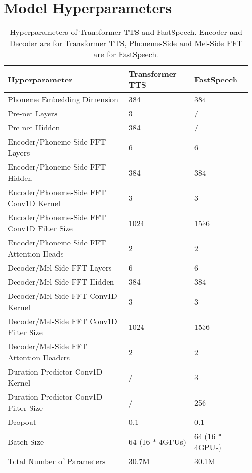 \documentclass{article}
\begin{document}
\section{Model Hyperparameters}
\begin{table}[h]
\caption{Hyperparameters of Transformer TTS and FastSpeech. Encoder and Decoder are for Transformer TTS, Phoneme-Side and Mel-Side FFT are for FastSpeech. }
\vspace{0.5cm}
\centering
\begin{tabular}{l|l|l}
\hline
\textbf{Hyperparameter}                     &   \textbf{Transformer TTS} & \textbf{FastSpeech}  \\ \hline
Phoneme Embedding Dimension                &        384       &  384  \\ \hline
Pre-net Layers                         &      3  &      /         \\ \hline
Pre-net Hidden                         &     384  &     /         \\ \hline
Encoder/Phoneme-Side FFT Layers                         &      6  &      6         \\ \hline
Encoder/Phoneme-Side FFT Hidden                         &      384  &   384         \\ \hline
Encoder/Phoneme-Side FFT Conv1D Kernel                  &       3   &    3         \\ \hline
Encoder/Phoneme-Side FFT Conv1D Filter Size             &      1024  &  1536         \\ \hline
Encoder/Phoneme-Side FFT Attention Heads              &      2  &  2         \\ \hline
Decoder/Mel-Side FFT Layers                         &      6    &      6         \\ \hline
Decoder/Mel-Side FFT Hidden                         &      384  &   384         \\ \hline
Decoder/Mel-Side FFT Conv1D Kernel                  &       3   &    3         \\ \hline
Decoder/Mel-Side FFT Conv1D Filter Size             &      1024  &  1536         \\ \hline
Decoder/Mel-Side FFT Attention Headers              &      2  &  2         \\ \hline
Duration Predictor Conv1D Kernel        &      /  &  3         \\ \hline
Duration Predictor Conv1D Filter Size      &      /  &  256         \\ \hline
Dropout                                &        0.1    &   0.1     \\   \hline
Batch Size                             &            64 (16 * 4GPUs)      &   64 (16 * 4GPUs)            \\ \hline \hline
Total Number of Parameters            &           30.7M	  &   30.1M                  \\ \hline
\end{tabular}
\label{tab:hyperparameters}
\end{table}
\end{document}
